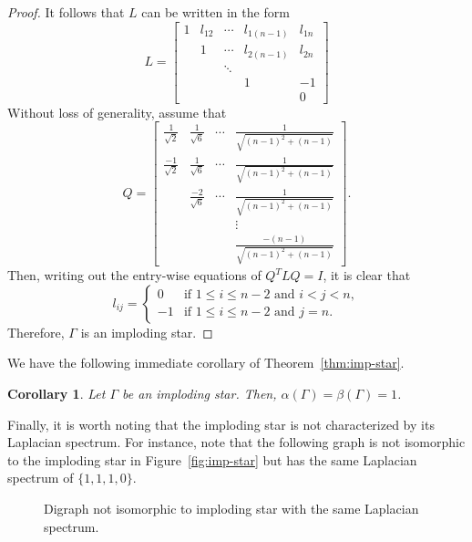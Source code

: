 \documentclass{article}
\newtheorem{corollary}[theorem]{Corollary}
\theoremstyle{definition}
\begin{document}
\begin{proof}
It follows that $L$ can be written in the form
\[
L=\begin{bmatrix} 1 & l_{12} & \cdots & l_{1(n-1)} & l_{1n} \\ & 1 & \cdots & l_{2(n-1)} & l_{2n} \\ & & \ddots & & \\ & & & 1 & -1 \\ & & & & 0\end{bmatrix}
\]
Without loss of generality, assume that
\[
Q=\begin{bmatrix} \frac{1}{\sqrt{2}} & \frac{1}{\sqrt{6}} & \cdots & \frac{1}{\sqrt{(n-1)^{2}+(n-1)}} \\ \frac{-1}{\sqrt{2}} & \frac{1}{\sqrt{6}} & \cdots & \frac{1}{\sqrt{(n-1)^{2}+(n-1)}} \\ & \frac{-2}{\sqrt{6}} & \cdots & \frac{1}{\sqrt{(n-1)^{2}+(n-1)}} \\ & & & \vdots \\ & & & \frac{-(n-1)}{\sqrt{(n-1)^{2}+(n-1)}} \end{bmatrix}.
\]
Then, writing out the entry-wise equations of $Q^{T}LQ=I$, it is clear that
\[
l_{ij} = 	\begin{cases}
		0 & \text{if $1\leq i\leq n-2$ and $i<j<n$}, \\
		-1 & \text{if $1\leq i\leq n-2$ and $j=n$}.
		\end{cases}
\]
Therefore, $\Gamma$ is an imploding star. 
\end{proof}

We have the following immediate corollary of Theorem~\ref{thm:imp-star}.
\begin{corollary}\label{thm:imp-star-alpha-beta}
Let $\Gamma$ be an imploding star.
Then, $\alpha(\Gamma)=\beta(\Gamma)=1$. 
\end{corollary}

Finally, it is worth noting that the imploding star is not characterized by its Laplacian spectrum.
For instance, note that the following graph is not isomorphic to the imploding star in Figure~\ref{fig:imp-star} but has the same Laplacian spectrum of $\{1,1,1,0\}$.
\begin{figure}[ht]
\centering
{}
\caption{Digraph not isomorphic to imploding star with the same Laplacian spectrum.}
\label{fig:niso-imp-star}
\end{figure}
\end{document}
